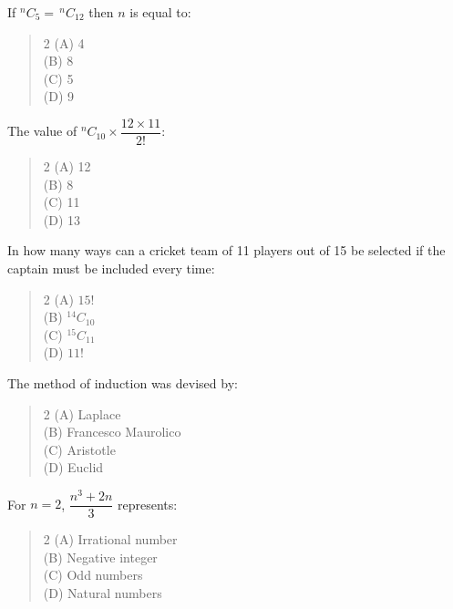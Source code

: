 \documentclass[11pt,a4paper]{article}
\begin{document}
\begin{mcqlist}
\item If $^nC_5=\,^nC_{12}$ then $n$ is equal to:
\begin{quote}\begin{multicols}{2}
\noindent (A) 4 \\
(B) 8 \\
(C) 5 \\
(D) 9
\end{multicols}\end{quote}

\item The value of $^nC_{10}\times\dfrac{12\times11}{2!}$:
\begin{quote}\begin{multicols}{2}
\noindent (A) 12 \\
(B) 8 \\
(C) 11 \\
(D) 13
\end{multicols}\end{quote}

\item In how many ways can a cricket team of 11 players out of 15 be selected if the captain must be included every time:
\begin{quote}\begin{multicols}{2}
\noindent (A) $15!$ \\
(B) $^{14}C_{10}$ \\
(C) $^{15}C_{11}$ \\
(D) $11!$
\end{multicols}\end{quote}

\item The method of induction was devised by:
\begin{quote}\begin{multicols}{2}
\noindent (A) Laplace \\
(B) Francesco Maurolico \\
(C) Aristotle \\
(D) Euclid
\end{multicols}\end{quote}

\item For $n=2$, $\dfrac{n^3+2n}{3}$ represents:
\begin{quote}\begin{multicols}{2}
\noindent (A) Irrational number \\
(B) Negative integer \\
(C) Odd numbers \\
(D) Natural numbers
\end{multicols}\end{quote}


\end{mcqlist}
\end{document}
